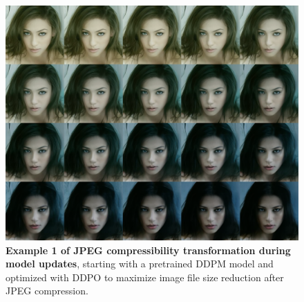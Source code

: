 \begin{appendixs}
        \begin{figure}
            \centering
            \includegraphics[scale=1.40]{img/results/compressibility_40.png}
            \vspace{-0pt}  %
            \captionsetup{width=\textwidth} %
            \caption{\textbf{Example 1 of JPEG compressibility transformation during model updates}, starting with a pretrained DDPM model and optimized with DDPO to maximize image file size reduction after JPEG compression.}
            \label{fig:ddpm-to-ddpo-compressibility-extra1}
        \end{figure}


\end{appendixs}
